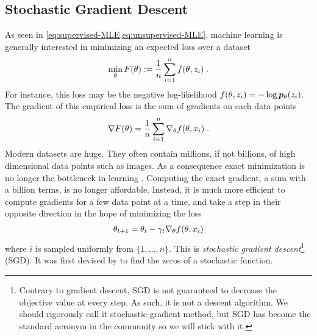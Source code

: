 \subsection{Stochastic Gradient Descent}
\label{ssec:SGD}
As seen in \cref{eq:supervised-MLE,eq:unsupervised-MLE}, machine learning is generally interested in minimizing an expected loss over a dataset
\begin{align}
    \min_\theta F(\theta) := \frac{1}{n} \sum_{i=1}^n f(\theta, z_i) \; .
\end{align}
For instance, this loss may be the negative log-likelihood  $f(\theta, z_i) = - \log \bm{p}_{\theta}(z_i)$. 
The gradient of this empirical loss is the sum of gradients on each data points
\begin{align}
    \nabla F (\theta) = \frac{1}{n}\sum_{i=1}^n \nabla_\theta f(\theta, x_i) \; .
\end{align}
Modern datasets are huge. They often contain millions, if not billions, of high dimensional data points such as images. 
As a consequence exact minimization is no longer the bottleneck in learning \citep{bottou2008tradeoffs}. 
Computing the exact gradient, a sum with a billion terms, is no longer affordable.
Instead, it is much more efficient to compute gradients for a few data point at a time, and take a step in their opposite direction in the hope of minimizing the loss
\begin{align}
    \theta_{t+1} = \theta_t - \gamma_t \nabla_\theta f(\theta, x_i)
\end{align}
where $i$ is sampled uniformly from $\{1, \dots, n\}$.
This is \emph{stochastic gradient descent}\footnote{
	Contrary to gradient descent, SGD is not guaranteed to decrease the objective value at every step. 
	As such, it is not a descent algorithm. 
	We should rigorously call it stochastic gradient method, but SGD has become the standard acronym in the community so we will stick with it.
}
(SGD).
It was first devised by \citet{robbins1951stochastic} to find the zeros of a stochastic function.



